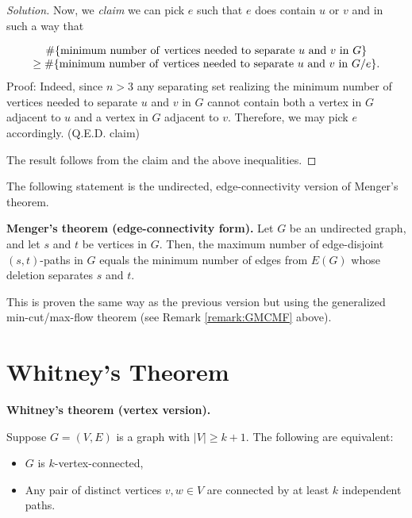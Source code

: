 \begin{proof}[Solution]
Now, we {\it claim} we can pick $e$ such that $e$ does contain $u$ or $v$
and in such a way that

\[
\begin{array}{c}
\# \{{\rm minimum\ number \ of\ vertices\ needed\ to\ separate\ }u\
{\rm and\  }v\ {\rm in\ }G\}\\
\geq
\# \{{\rm minimum\ number \ of\ vertices\ needed\ to\ separate\ }u\
{\rm and\  }v\ {\rm in}\ G/e\}.
\end{array}
\]
Proof: Indeed, since $n>3$ any separating set realizing
the minimum number  of vertices needed to separate $u$ and
$v$ in $G$ cannot contain both a vertex in $G$ adjacent to $u$ and a vertex in
$G$ adjacent to $v$. Therefore, we may pick $e$ accordingly.
(Q.E.D. claim)

The result follows from the claim and the above inequalities.
\end{proof}

The following statement
is the undirected, edge-connectivity version of
Menger's theorem.

\begin{theorem}
\textbf{Menger's theorem (edge-connectivity form).}
{\rm
Let $G$ be an undirected graph, and let $s$ and $t$ be vertices in
$G$.
Then, the maximum number of edge-disjoint $(s,t)$-paths in
$G$
equals the minimum number of edges from $E(G)$ whose
deletion separates $s$ and $t$.
}
\end{theorem}

This is proven the same way as the previous version
but using the generalized min-cut/max-flow theorem (see
Remark \ref{remark:GMCMF} above).



\section{Whitney's Theorem}

\begin{theorem}
\textbf{Whitney's theorem (vertex version).}
{\rm
Suppose $G=(V,E)$ is a graph with $|V|\geq k+1$. The following are
equivalent:
\begin{itemize}
\item
$G$ is $k$-vertex-connected,
\item
Any pair of distinct vertices $v,w\in V$ are connected by
at least $k$ independent paths.
\end{itemize}
}
\end{theorem}

